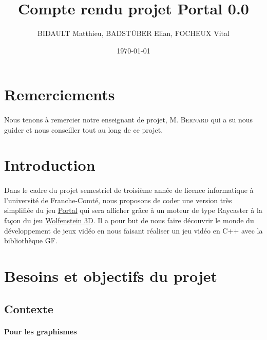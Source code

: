 \documentclass[12pt]{report}
\title{Compte rendu projet Portal 0.0}
\author{BIDAULT Matthieu, BADSTÜBER Elian, FOCHEUX Vital}
\date{\today}
\begin{document}
\maketitle

\section*{Remerciements}

\paragraph{}
Nous tenons à remercier notre enseignant de projet, M. \textsc{Bernard} 
qui a su nous guider et nous conseiller tout au long de ce projet.


\tableofcontents

\section{Introduction}

\paragraph{}

Dans le cadre du projet semestriel de troisième année de licence
informatique à l'université de Franche-Comté, nous proposons de coder
une version très simplifiée du jeu \href{https://fr.wikipedia.org/wiki/Portal_(jeu_vid%C3%A9o)}{Portal}
qui sera afficher grâce à un moteur de type Raycaster à la façon du jeu
\href{https://fr.wikipedia.org/wiki/Wolfenstein_3D}{Wolfenstein 3D}.
Il a pour but de nous faire découvrir le monde du développement de jeux 
vidéo en nous faisant réaliser un jeu vidéo en C++ avec la bibliothèque 
GF.

\clearpage

\section{Besoins et objectifs du projet}
\subsection{Contexte}

\paragraph{Pour les graphismes}
\end{document}
